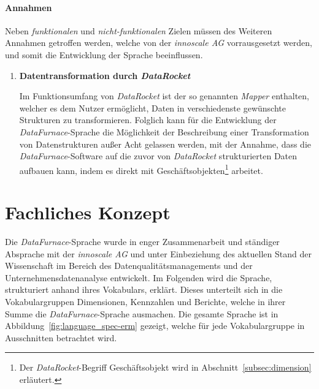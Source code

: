 \documentclass[
  language=german, %
  type=bachelor%
]{isthesis}
\begin{document}
\begin{content}
\begin{enumerate}
    \end{enumerate}

	\paragraph{Annahmen} Neben \textit{funktionalen} und
	\textit{nicht-funktionalen} Zielen müssen des Weiteren Annahmen getroffen
	werden, welche von der \textit{innoscale AG} vorrausgesetzt werden, und somit
	die Entwicklung der Sprache beeinflussen.

  \begin{enumerate}
    \item \textbf{Datentransformation durch \textit{DataRocket}}

      Im Funktionsumfang von \textit{DataRocket} ist der so genannten
      \textit{Mapper} enthalten, welcher es dem Nutzer ermöglicht, Daten in
      verschiedenste gewünschte Strukturen zu transformieren. Folglich kann für
      die Entwicklung der \textit{DataFurnace}-Sprache die Möglichkeit der
      Beschreibung einer Transformation von Datenstrukturen außer Acht gelassen
      werden, mit der Annahme, dass die \textit{DataFurnace}-Software auf die
      zuvor von \textit{DataRocket} strukturierten Daten aufbauen kann, indem
      es direkt mit Geschäftsobjekten\footnote{Der \textit{DataRocket}-Begriff
      Geschäftsobjekt wird in Abschnitt~\ref{subsec:dimension} erläutert.}
      arbeitet.


  \end{enumerate}


  \section{Fachliches Konzept}

  Die \textit{DataFurnace}-Sprache wurde in enger Zusammenarbeit und ständiger
  Absprache mit der \textit{innoscale AG} und unter Einbeziehung des
  aktuellen Stand der Wissenschaft im Bereich des Datenqualitätsmanagements und
  der Unternehmensdatenanalyse entwickelt. Im Folgenden wird die Sprache,
  strukturiert anhand ihres Vokabulars, erklärt. Dieses unterteilt sich in die
  Vokabulargruppen Dimensionen, Kennzahlen und Berichte, welche in ihrer Summe
  die \textit{DataFurnace}-Sprache ausmachen. Die gesamte Sprache ist in
  Abbildung~\ref{fig:language_spec-erm} gezeigt, welche für jede
  Vokabulargruppe in Ausschnitten betrachtet wird.


\end{content}
\end{document}
